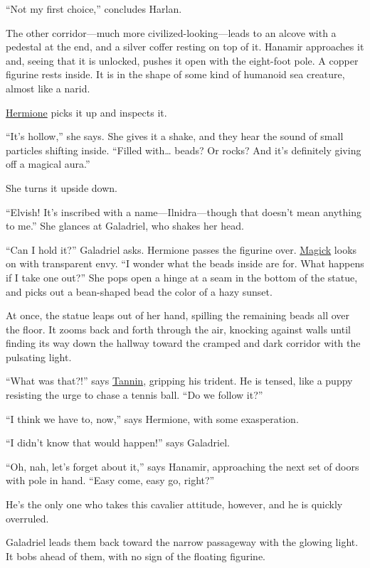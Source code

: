 \documentclass[smalldemyvopaper,11pt,twoside,onecolumn,openright,extrafontsizes]{memoir}
\begin{document}
``Not my first choice,'' concludes Harlan.

The other corridor---much more civilized-looking---leads to an alcove
with a pedestal at the end, and a silver coffer resting on top of it.
Hanamir approaches it and, seeing that it is unlocked, pushes it open
with the eight-foot pole. A copper figurine rests inside. It is in the
shape of some kind of humanoid sea creature, almost like a narid.

\href{/characters/hermione/}{Hermione} picks it up and inspects it.

``It's hollow,'' she says. She gives it a shake, and they hear the sound
of small particles shifting inside. ``Filled with\ldots{} beads? Or
rocks? And it's definitely giving off a magical aura.''

She turns it upside down.

``Elvish! It's inscribed with a name---Ilnidra---though that doesn't
mean anything to me.'' She glances at Galadriel, who shakes her head.

``Can I hold it?'' Galadriel asks. Hermione passes the figurine over.
\href{/characters/magick/}{Magick} looks on with transparent envy. ``I
wonder what the beads inside are for. What happens if I take one out?''
She pops open a hinge at a seam in the bottom of the statue, and picks
out a bean-shaped bead the color of a hazy sunset.

At once, the statue leaps out of her hand, spilling the remaining beads
all over the floor. It zooms back and forth through the air, knocking
against walls until finding its way down the hallway toward the cramped
and dark corridor with the pulsating light.

``What was that?!'' says \href{/characters/tannin/}{Tannin}, gripping
his trident. He is tensed, like a puppy resisting the urge to chase a
tennis ball. ``Do we follow it?''

``I think we have to, now,'' says Hermione, with some exasperation.

``I didn't know that would happen!'' says Galadriel.

``Oh, nah, let's forget about it,'' says Hanamir, approaching the next
set of doors with pole in hand. ``Easy come, easy go, right?''

He's the only one who takes this cavalier attitude, however, and he is
quickly overruled.

Galadriel leads them back toward the narrow passageway with the glowing
light. It bobs ahead of them, with no sign of the floating figurine.
\end{document}
